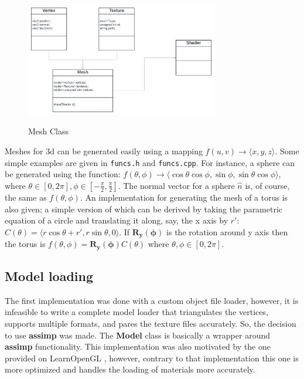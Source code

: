\begin{figure}[H]
    \centering
    \includegraphics[width=0.75\textwidth]{images/mesh_uml.png}
    \caption{Mesh Class} \cite{learnopengl}
    \label{fig:mesh_uml}
\end{figure}

Meshes for 3d can be generated easily using a mapping $f (u, v)\rightarrow 
\langle x, y, z \rangle$. Some simple examples are given in \texttt{funcs.h} and \texttt{funcs.cpp}. For instance, a sphere can be generated using the function: $f (\theta, \phi) \rightarrow \langle \cos\theta\cos\phi, \sin\phi, \sin\theta\cos\phi \rangle$, where $\theta \in [0, 2\pi], \phi \in [-\frac{\pi}{2}, \frac{\pi}{2}]$. The normal vector for a sphere $\hat{n}$ is, of course, the same as $f (\theta, \phi)$. An implementation for generating the mesh of a torus is also given; a simple version of which can be derived by taking the parametric equation of a circle and translating it along, say, the x axis by $r\prime$: $C (\theta) = \langle r\cos\theta+r\prime, r\sin\theta, 0 \rangle$. If $\mathbf{R_y (\phi)}$ is the rotation around y axis then the torus is $f (\theta, \phi) = \mathbf{R_y( \phi)}C( \theta)$ where $\theta, \phi \in [0, 2\pi]$.


\subsection{Model loading}
The first implementation was done with a custom object file loader, however, it is infeasible to write a complete model loader that triangulates the vertices, supports multiple formats, and pares the texture files accurately. So, the decision to use \textbf{assimp} was made. The \textbf{Model} class is basically a wrapper around \textbf{assimp} functionality. This implementation was also motivated by the one provided on LearnOpenGL \cite{learnopengl}, however, contrary to that implementation this one is more optimized and handles the loading of materials more accurately.

